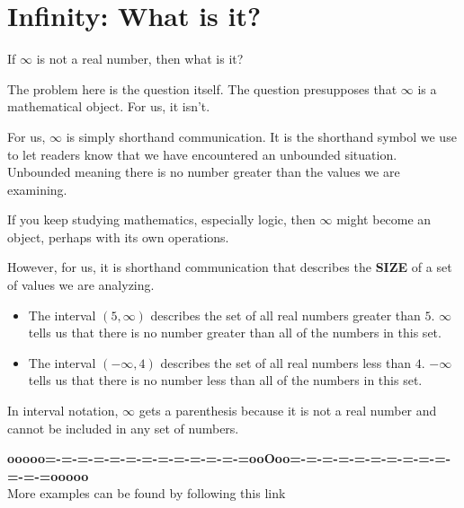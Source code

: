 \documentclass{ximera}
\begin{document}
\section{Infinity: What is it?}


If $\infty$ is not a real number, then what is it?


The problem here is the question itself.  The question presupposes that $\infty$ is a mathematical object.  For us, it isn't.   

For us, $\infty$ is simply shorthand communication.  It is the shorthand symbol we use to let readers know that we have encountered an unbounded situation. Unbounded meaning there is no number greater than the values we are examining.


If you keep studying mathematics, especially logic, then $\infty$ might become an object, perhaps with its own operations.

However, for us, it is shorthand communication that describes the \textbf{SIZE} of a set of values we are analyzing.







\begin{example}


\begin{itemize}
\item The interval $(5, \infty)$ describes the set of all real numbers greater than $5$.  $\infty$ tells us that there is no number greater than all of the numbers in this set.



\item The interval $(-\infty, 4)$ describes the set of all real numbers less than $4$.  $-\infty$ tells us that there is no number less than all of the numbers in this set.
\end{itemize}




\end{example}
In interval notation, $\infty$ gets a parenthesis because it is not a real number and cannot be included in any set of numbers.



























\begin{center}
\textbf{\textcolor{green!50!black}{ooooo=-=-=-=-=-=-=-=-=-=-=-=-=ooOoo=-=-=-=-=-=-=-=-=-=-=-=-=ooooo}} \\

More examples can be found by following this link\\ 

\end{center}
\end{document}
